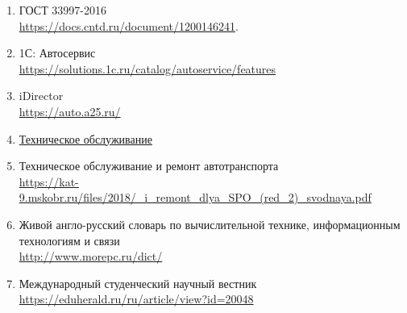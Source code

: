 \begin{enumerate}
	\item ГОСТ 33997-2016 \\
	\url{https://docs.cntd.ru/document/1200146241}.
		\label{ref:ГОСТ-требования-то}

	\item 1С: Автосервис\\
		\url{https://solutions.1c.ru/catalog/autoservice/features}
		\label{ref:1С-автосервис}

	\item iDirector\\
		\url{https://auto.a25.ru/}
		\label{ref:iDirector}

	\item \href{http://абсолютпб.рф/техническое-обслуживание}{Техническое
		обслуживание}
		\label{ref:техническое-обслуживание}

	\item Техническое обслуживание и ремонт автотранспорта \\
		\url{https://kat-9.mskobr.ru/files/2018/_i_remont_dlya_SPO_(red_2)_svodnaya.pdf}
		\label{ref:му-ремонт-и-техническое-обслуживание}

	\item Живой англо-русский словарь по вычислительной технике, информационным технологиям и связи\\
		\url{http://www.morepc.ru/dict/}
		\label{ref:календарное-планирование}

	\item Международный студенческий научный вестник\\
		\url{https://eduherald.ru/ru/article/view?id=20048}
		\label{ref:er-диаграммы}


\end{enumerate}
